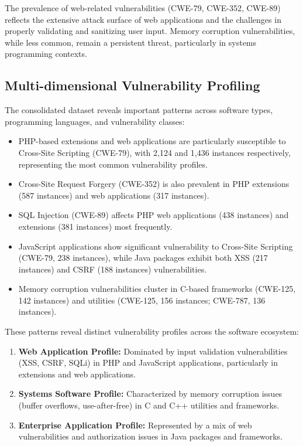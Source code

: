 The prevalence of web-related vulnerabilities (CWE-79, CWE-352, CWE-89) reflects the extensive attack surface of web applications and the challenges in properly validating and sanitizing user input. Memory corruption vulnerabilities, while less common, remain a persistent threat, particularly in systems programming contexts.

\subsection{Multi-dimensional Vulnerability Profiling}

The consolidated dataset reveals important patterns across software types, programming languages, and vulnerability classes:

\begin{itemize}
    \item PHP-based extensions and web applications are particularly susceptible to Cross-Site Scripting (CWE-79), with 2,124 and 1,436 instances respectively, representing the most common vulnerability profiles.
    \item Cross-Site Request Forgery (CWE-352) is also prevalent in PHP extensions (587 instances) and web applications (317 instances).
    \item SQL Injection (CWE-89) affects PHP web applications (438 instances) and extensions (381 instances) most frequently.
    \item JavaScript applications show significant vulnerability to Cross-Site Scripting (CWE-79, 238 instances), while Java packages exhibit both XSS (217 instances) and CSRF (188 instances) vulnerabilities.
    \item Memory corruption vulnerabilities cluster in C-based frameworks (CWE-125, 142 instances) and utilities (CWE-125, 156 instances; CWE-787, 136 instances).
\end{itemize}

These patterns reveal distinct vulnerability profiles across the software ecosystem:

\begin{enumerate}
    \item \textbf{Web Application Profile:} Dominated by input validation vulnerabilities (XSS, CSRF, SQLi) in PHP and JavaScript applications, particularly in extensions and web applications.
    \item \textbf{Systems Software Profile:} Characterized by memory corruption issues (buffer overflows, use-after-free) in C and C++ utilities and frameworks.
    \item \textbf{Enterprise Application Profile:} Represented by a mix of web vulnerabilities and authorization issues in Java packages and frameworks.
\end{enumerate}

